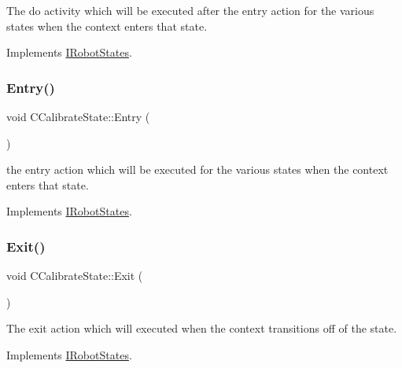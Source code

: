The do activity which will be executed after the entry action for the various states when the context enters that state. 



Implements \hyperlink{classIRobotStates_aa681381e72738a2870c3f13f552a2e93}{I\+Robot\+States}.

\mbox{\label{classCCalibrateState_a361368643bad182ed1a78ee1d1a820e5}} 
\subsubsection{\texorpdfstring{Entry()}{Entry()}}
{\footnotesize\ttfamily void C\+Calibrate\+State\+::\+Entry (\begin{DoxyParamCaption}{ }\end{DoxyParamCaption})\hspace{0.3cm}{\ttfamily [virtual]}}



the entry action which will be executed for the various states when the context enters that state. 



Implements \hyperlink{classIRobotStates_af43ddb52f5100b42c3d11b71fb1f10dd}{I\+Robot\+States}.

\mbox{\label{classCCalibrateState_a0bdb13da2af72f1e8e814a365f8d765a}} 
\subsubsection{\texorpdfstring{Exit()}{Exit()}}
{\footnotesize\ttfamily void C\+Calibrate\+State\+::\+Exit (\begin{DoxyParamCaption}{ }\end{DoxyParamCaption})\hspace{0.3cm}{\ttfamily [virtual]}}



The exit action which will executed when the context transitions off of the state. 



Implements \hyperlink{classIRobotStates_a099417875e67f047ca38e08890491529}{I\+Robot\+States}.

